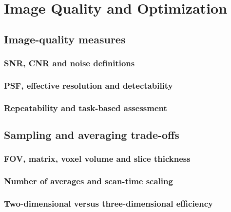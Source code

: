 \chapter{Image Quality and Optimization}
\label{ch:24}

\section{Image-quality measures}
\label{sec:24:image-quality-measures}
\subsection{SNR, CNR and noise definitions}
\subsection{PSF, effective resolution and detectability}
\subsection{Repeatability and task-based assessment}

\section{Sampling and averaging trade-offs}
\label{sec:24:sampling-and-averaging-trade-offs}
\subsection{FOV, matrix, voxel volume and slice thickness}
\subsection{Number of averages and scan-time scaling}
\subsection{Two-dimensional versus three-dimensional efficiency}

